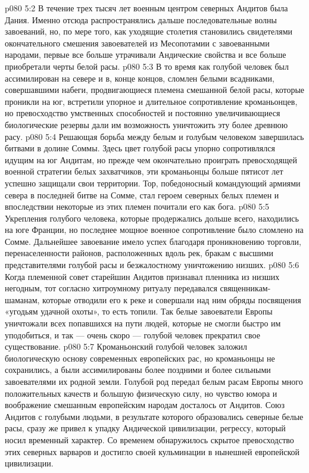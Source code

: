 \vs p080 5:2 В течение трех тысяч лет военным центром северных Андитов была Дания. Именно отсюда распространялись дальше последовательные волны завоеваний, но, по мере того, как уходящие столетия становились свидетелями окончательного смешения завоевателей из Месопотамии с завоеванными народами, первые все больше утрачивали Андические свойства и все больше приобретали черты белой расы.
\vs p080 5:3 \pc В то время как голубой человек был ассимилирован на севере и в, конце концов, сломлен белыми всадниками, совершавшими набеги, продвигающиеся племена смешанной белой расы, которые проникли на юг, встретили упорное и длительное сопротивление кроманьонцев, но превосходство умственных способностей и постоянно увеличивающиеся биологические резервы дали им возможность уничтожить эту более древнюю расу.
\vs p080 5:4 Решающая борьба между белым и голубым человеком завершилась битвами в долине Соммы. Здесь цвет голубой расы упорно сопротивлялся идущим на юг Андитам, но прежде чем окончательно проиграть превосходящей военной стратегии белых захватчиков, эти кроманьонцы больше пятисот лет успешно защищали свои территории. Тор, победоносный командующий армиями севера в последней битве на Сомме, стал героем северных белых племен и впоследствии некоторые из этих племен почитали его как бога.
\vs p080 5:5 \pc Укрепления голубого человека, которые продержались дольше всего, находились на юге Франции, но последнее мощное военное сопротивление было сломлено на Сомме. Дальнейшее завоевание имело успех благодаря проникновению торговли, перенаселенности районов, расположенных вдоль рек, бракам с высшими представителями голубой расы и безжалостному уничтожению низших.
\vs p080 5:6 Когда племенной совет старейшин Андитов признавал пленника из низших негодным, тот согласно хитроумному ритуалу передавался священникам\hyp{}шаманам, которые отводили его к реке и совершали над ним обряды посвящения «угодьям удачной охоты», то есть топили. Так белые завоеватели Европы уничтожали всех попавшихся на пути людей, которые не смогли быстро им уподобиться, и так --- очень скоро --- голубой человек прекратил свое существование.
\vs p080 5:7 \pc Кроманьонский голубой человек заложил биологическую основу современных европейских рас, но кроманьонцы не сохранились, а были ассимилированы более поздними и более сильными завоевателями их родной земли. Голубой род передал белым расам Европы много положительных качеств и большую физическую силу, но чувство юмора и воображение смешанным европейским народам досталось от Андитов. Союз Андитов с голубыми людьми, в результате которого образовались северные белые расы, сразу же привел к упадку Андической цивилизации, регрессу, который носил временный характер. Со временем обнаружилось скрытое превосходство этих северных варваров и достигло своей кульминации в нынешней европейской цивилизации.
